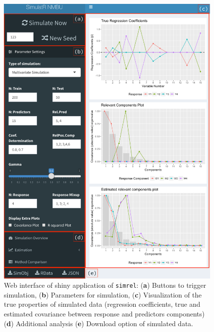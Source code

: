 \documentclass[review]{elsarticle}
\theoremstyle{definition}
\theoremstyle{definition}
\theoremstyle{definition}
\theoremstyle{remark}
\begin{document}
\begin{figure}[!htb]

{\centering \includegraphics[width=1\linewidth]{images/AppSimulatr} 

}

\caption{Web interface of shiny application of \texttt{simrel}:
(\textbf{a}) Buttons to trigger simulation, (\textbf{b}) Parameters for
simulation, (\textbf{c}) Visualization of the true properties of
simulated data (regression coefficients, true and estimated covariance
between response and predictors components) (\textbf{d}) Additional
analysis (\textbf{e}) Download option of simulated data.}\label{fig:AppSimulatr}
\end{figure}
\end{document}
